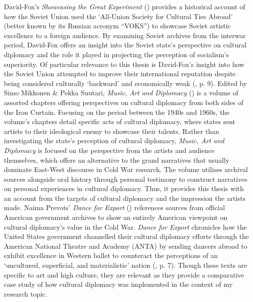 David-Fox’s \textit{Showcasing the Great Experiment} (\citeyear{david-fox2011}) provides a historical account of how the Soviet Union used the ‘All-Union Society for Cultural Ties Abroad’ (better known by its Russian acronym “VOKS”) to showcase Soviet artistic excellence to a foreign audience. By examining Soviet archives from the interwar period, David-Fox offers an insight into the Soviet state’s perspective on cultural diplomacy and the role it played in projecting the perception of socialism’s superiority. Of particular relevance to this thesis is David-Fox’s insight into how the Soviet Union attempted to improve their international reputation despite being considered culturally ‘backward’ and economically weak (\cite{david-fox2011}, p. 9). Edited by Simo Mikkonen \& Pekka Suutari, \textit{Music, Art and Diplomacy} (\citeyear{mikkonensuutari2016}) is a volume of assorted chapters offering perspectives on cultural diplomacy from both sides of the Iron Curtain. Focusing on the period between the 1940s and 1960s, the volume’s chapters detail specific acts of cultural diplomacy, where states sent artists to their ideological enemy to showcase their talents. Rather than investigating the state’s perception of cultural diplomacy, \textit{Music, Art and Diplomacy} is focused on the perspective from the artists and audience themselves, which offers an alternative to the grand narratives that usually dominate East-West discourse in Cold War research. The volume utilises archival sources alongside oral history through personal testimony to construct narratives on personal experiences in cultural diplomacy. Thus, it provides this thesis with an account from the targets of cultural diplomacy and the impression the artists made. Naima Prevots’ \textit{Dance for Export} (\citeyear{prevots1998}) references sources from official American government archives to show an entirely American viewpoint on cultural diplomacy’s value in the Cold War. \textit{Dance for Export} chronicles how the United States government channelled their cultural diplomacy efforts through the American National Theatre and Academy (ANTA) by sending dancers abroad to exhibit excellence in Western ballet to counteract the perceptions of an ‘uncultured, superficial, and materialistic’ nation (\cite{prevots1998}, p. 7). Though these texts are specific to art and high culture, they are relevant as they provide a comparative case study of how cultural diplomacy was implemented in the context of my research topic.

